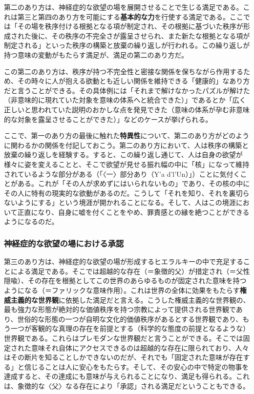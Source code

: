第二のあり方は、神経症的な欲望の場を展開させることで生じる満足である。これは第三と第四のあり方を可能にする\textbf{基本的な力}を行使する満足である。ここでは「その場を秩序付ける根拠となる項が制定され、その根拠に基づいた秩序が形成された後に、その秩序の不完全さが露呈させられ、また新たな根拠となる項が制定される」といった秩序の構築と放棄の繰り返しが行われる。この繰り返しが持つ意味の変動がもたらす満足が、満足の第二のあり方だ。

この第二のあり方は、秩序が持つ不完全性と密接な関係を保ちながら作用するため、その時々に人が抱える欲動とも近しい関係を維持できる「健康的」なあり方だと言うことができる。その具体例には「それまで解けなかったパズルが解けた（非意味的に現れていた対象を意味の体系へと統合できた）」であるとか「広く正しいと思われていた説明のおかしな点を発見できた（意味の体系が孕む非意味的な対象を露呈させることができた）」などのケースが挙げられる。

ここで、第一のあり方の最後に触れた\textbf{特異性}について、第二のあり方がどのように関わるかの関係を付記しておこう。第二のあり方において、人は秩序の構築と放棄の繰り返しを経験する。すると、この繰り返し通じて、人は自身の欲望が様々に姿を変えることと、そこで欲望が見せる振れ幅の中に「核」になって維持されているような部分がある（「〈一〉部分あり（Y'a
d'l'Un）」）ことに気付くことがある。これが「その人が求めずにはいられないもの」であり、その核の中にその人に特有の現実的な欲動があるのだ。こうして「それを知り、それを裏切らないようにする」という境涯が開かれることになる。そして、人はこの境涯において正直になり、自身に嘘を付くことをやめ、罪責感との縁を絶つことができるようになるのだ。

\subsubsection{神経症的な欲望の場における承認}\label{ux795eux7d4cux75c7ux7684ux306aux6b32ux671bux306eux5834ux306bux304aux3051ux308bux627fux8a8d}

第三のあり方は、神経症的な欲望の場が形成するヒエラルキーの中で充足することによる満足である。そこでは超越的な存在（＝象徴的父）が措定され（＝父性隠喩）、その存在を根拠としてこの世界のあらゆるものが固定された意味を持つようになる（＝ファリックな意味作用）。これは世界の全体に効果をもたらす\textbf{権威主義的な世界観}に依拠した満足だと言える。こうした権威主義的な世界観の、最も強力な形態が絶対的な価値秩序を持つ宗教によって提供される世界観であり、世俗的な形態の一つが自明な文化的価値秩序があるとする世界観であり、もう一つが客観的な真理の存在を前提とする（科学的な態度の前提となるような）世界観である。これらはプレモダンな世界観だと言うことができる。そこでは固定された意味それ自体にアクセスできるのは超越的な存在に限られており、人々はその断片を知ることしかできないのだが、それでも「固定された意味が存在する」と信じることは人に安心をもたらす。そして、その安心の中で特定の物事を達成すると、その達成にも意味が与えられることになり、満足も得られる。これは、象徴的な〈父〉なる存在により「承認」される満足だということもできる。

